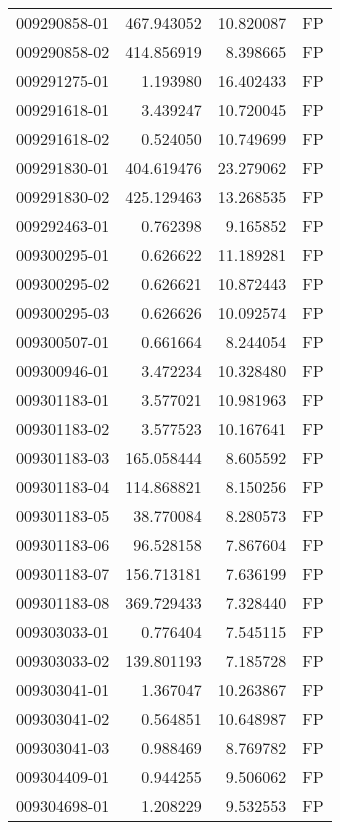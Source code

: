 \begin{tabular}{lrrl}
009290858-01 &  467.943052 &      10.820087 &   FP \\
009290858-02 &  414.856919 &       8.398665 &   FP \\
009291275-01 &    1.193980 &      16.402433 &   FP \\
009291618-01 &    3.439247 &      10.720045 &   FP \\
009291618-02 &    0.524050 &      10.749699 &   FP \\
009291830-01 &  404.619476 &      23.279062 &   FP \\
009291830-02 &  425.129463 &      13.268535 &   FP \\
009292463-01 &    0.762398 &       9.165852 &   FP \\
009300295-01 &    0.626622 &      11.189281 &   FP \\
009300295-02 &    0.626621 &      10.872443 &   FP \\
009300295-03 &    0.626626 &      10.092574 &   FP \\
009300507-01 &    0.661664 &       8.244054 &   FP \\
009300946-01 &    3.472234 &      10.328480 &   FP \\
009301183-01 &    3.577021 &      10.981963 &   FP \\
009301183-02 &    3.577523 &      10.167641 &   FP \\
009301183-03 &  165.058444 &       8.605592 &   FP \\
009301183-04 &  114.868821 &       8.150256 &   FP \\
009301183-05 &   38.770084 &       8.280573 &   FP \\
009301183-06 &   96.528158 &       7.867604 &   FP \\
009301183-07 &  156.713181 &       7.636199 &   FP \\
009301183-08 &  369.729433 &       7.328440 &   FP \\
009303033-01 &    0.776404 &       7.545115 &   FP \\
009303033-02 &  139.801193 &       7.185728 &   FP \\
009303041-01 &    1.367047 &      10.263867 &   FP \\
009303041-02 &    0.564851 &      10.648987 &   FP \\
009303041-03 &    0.988469 &       8.769782 &   FP \\
009304409-01 &    0.944255 &       9.506062 &   FP \\
009304698-01 &    1.208229 &       9.532553 &   FP \\

\end{tabular}
